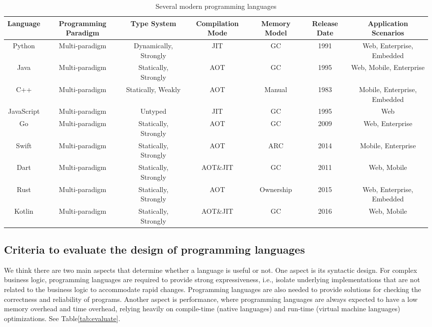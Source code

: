\begin{table}[hbtp]
    \caption{Several modern programming languages}
    \label{tab:selected-languages}
    \begin{center}
        \begin{tabular}{ccccccc}
            \toprule
            Language & Programming Paradigm & Type System & Compilation Mode & Memory Model &
            Release Date & Application Scenarios \\
            \midrule
            Python & Multi-paradigm & Dynamically, Strongly & JIT & GC & 1991 & Web,
            Enterprise, Embedded \\
            Java & Multi-paradigm & Statically, Strongly & AOT & GC & 1995 & Web,
            Mobile, Enterprise \\
            C++ & Multi-paradigm & Statically, Weakly & AOT & Manual & 1983 & Mobile,
            Enterprise, Embedded \\
            JavaScript & Multi-paradigm & Untyped & JIT & GC & 1995 &
            Web \\
            Go & Multi-paradigm & Statically, Strongly & AOT & GC & 2009 & Web,
            Enterprise \\
            Swift & Multi-paradigm & Statically, Strongly & AOT & ARC & 2014 &
            Mobile, Enterprise \\
            Dart & Multi-paradigm & Statically, Strongly & AOT\&JIT & GC & 2011 &
            Web, Mobile \\
            Rust & Multi-paradigm & Statically, Strongly & AOT & Ownership & 2015 &
            Web, Enterprise, Embedded \\
            Kotlin & Multi-paradigm & Statically, Strongly & AOT\&JIT & GC & 2016 &
            Web, Mobile \\
            \bottomrule
        \end{tabular}
    \end{center}
\end{table}

\subsection{Criteria to evaluate the design of programming languages}

We think there are two main aspects that determine whether a language is useful or not.
One aspect is its syntactic design.
For complex business logic, programming languages are required to provide
strong expressiveness, i.e., isolate underlying implementations
that are not related to the business logic to accommodate rapid changes.
Programming languages are also needed to provide solutions for
checking the correctness and reliability of programs.
Another aspect is performance, where programming languages are
always expected to have a low memory overhead and time overhead,
relying heavily on compile-time (native languages) and run-time
(virtual machine languages) optimizations.
See Table\ref{tab:evaluate}.

